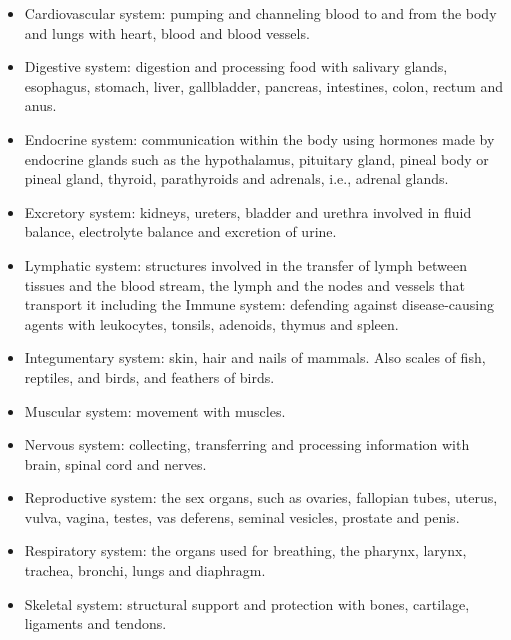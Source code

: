 \begin{itemize}
\tightlist
\item
  Cardiovascular system: pumping and channeling blood to and from the body and lungs with heart, blood and blood vessels.
\item
  Digestive system: digestion and processing food with salivary glands, esophagus, stomach, liver, gallbladder, pancreas, intestines, colon, rectum and anus.
\item
  Endocrine system: communication within the body using hormones made by endocrine glands such as the hypothalamus, pituitary gland, pineal body or pineal gland, thyroid, parathyroids and adrenals, i.e., adrenal glands.
\item
  Excretory system: kidneys, ureters, bladder and urethra involved in fluid balance, electrolyte balance and excretion of urine.
\item
  Lymphatic system: structures involved in the transfer of lymph between tissues and the blood stream, the lymph and the nodes and vessels that transport it including the Immune system: defending against disease-causing agents with leukocytes, tonsils, adenoids, thymus and spleen.
\item
  Integumentary system: skin, hair and nails of mammals. Also scales of fish, reptiles, and birds, and feathers of birds.
\item
  Muscular system: movement with muscles.
\item
  Nervous system: collecting, transferring and processing information with brain, spinal cord and nerves.
\item
  Reproductive system: the sex organs, such as ovaries, fallopian tubes, uterus, vulva, vagina, testes, vas deferens, seminal vesicles, prostate and penis.
\item
  Respiratory system: the organs used for breathing, the pharynx, larynx, trachea, bronchi, lungs and diaphragm.
\item
  Skeletal system: structural support and protection with bones, cartilage, ligaments and tendons.
\end{itemize}




